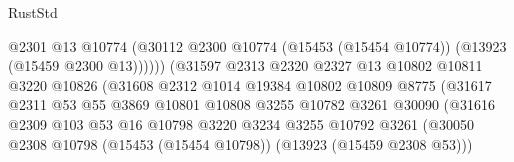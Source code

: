 \begin{lexlean}{RustStd}
\begin{coremodule}
                                            @2301
                                            @13
                                            @10774
                                            (@30112
                                              @2300
                                              @10774
                                              (@15453 (@15454 @10774))
                                              (@13923 (@15459 @2300 @13))))))
                                      (@31597
                                        @2313
                                        @2320
                                        @2327
                                        @13
                                        @10802
                                        @10811
                                        @3220
                                        @10826
                                        (@31608
                                          @2312
                                          @1014
                                          @19384
                                          @10802
                                          @10809
                                          @8775
                                          (@31617
                                            @2311
                                            @53
                                            @55
                                            @3869
                                            @10801
                                            @10808
                                            @3255
                                            @10782
                                            @3261
                                            @30090
                                            (@31616
                                              @2309
                                              @103
                                              @53
                                              @16
                                              @10798
                                              @3220
                                              @3234
                                              @3255
                                              @10792
                                              @3261
                                              (@30050
                                                @2308
                                                @10798
                                                (@15453 (@15454 @10798))
                                                (@13923 (@15459 @2308 @53)))

\end{coremodule}
\end{lexlean}
